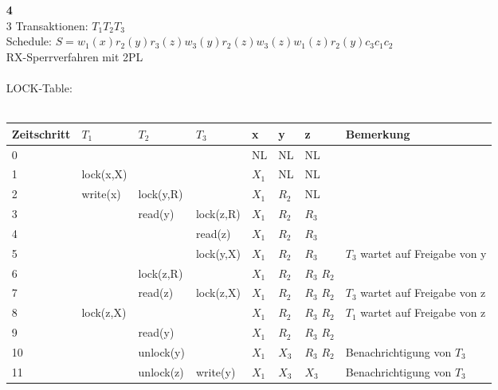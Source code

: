 \documentclass[a4paper,11pt,fleqn]{scrartcl}
\begin{document}
\begin{enumerate}
			\newpage
			\item[\textbf{4}]\quad \\
				3 Transaktionen: $T_1 T_2 T_3$ \\
				Schedule: $S = w_1(x) r_2(y) r_3(z) w_3(y) r_2(z) w_3(z) w_1(z) r_2(y) c_3 c_1 c_2$\\
				RX-Sperrverfahren mit 2PL\\
				\\
				LOCK-Table:\\
				\\
			\begin{tabular}{|p{2cm}|p{2cm}|p{2cm}|p{2cm}|p{1cm}|p{1cm}|p{1cm}|p{3cm}|}
				\hline
				Zeitschritt & $T_1$       & $T_2$       & $T_3$       & x     & y     & z     & Bemerkung\\
				\hline
				\hline
				0           &             &             &             & NL    & NL    & NL    & \\
				\hline
				1           & lock(x,X)   &             &             & $X_1$ & NL    & NL    & \\
				\hline
				2           & write(x)    & lock(y,R)   &             & $X_1$ & $R_2$ & NL    & \\
				\hline
				3           &             & read(y)     & lock(z,R)   & $X_1$ & $R_2$ & $R_3$ & \\
				\hline
				4           &             &             & read(z)     & $X_1$ & $R_2$ & $R_3$ & \\
				\hline
				5           &             &             & lock(y,X)   & $X_1$ & $R_2$ & $R_3$ & $T_3$ wartet auf Freigabe von y\\
				\hline
				6           &             & lock(z,R)   &             & $X_1$ & $R_2$ & $R_3$ $R_2$ & \\
				\hline
				7           &             & read(z)     & lock(z,X)   & $X_1$ & $R_2$ & $R_3$ $R_2$ & $T_3$ wartet auf Freigabe von z\\
				\hline
				8           & lock(z,X)   &             &             & $X_1$ & $R_2$ & $R_3$ $R_2$ & $T_1$ wartet auf Freigabe von z\\
				\hline
				9           &             & read(y)     &             & $X_1$ & $R_2$ & $R_3$ $R_2$ & \\
				\hline
				10          &             & unlock(y)   &             & $X_1$ & $X_3$ & $R_3$ $R_2$ & Benachrichtigung von $T_3$\\
				\hline
				11          &             & unlock(z)   & write(y)    & $X_1$ & $X_3$ & $X_3$ & Benachrichtigung von $T_3$\\

\end{tabular}
\end{enumerate}
\end{document}
